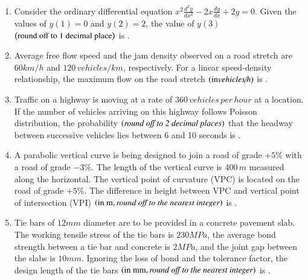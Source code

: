 \documentclass[journal,12pt,onecolumn]{IEEEtran}
\theoremstyle{remark}
\begin{document}
\begin{enumerate}
\item Consider the ordinary differential equation $x^2 \frac{d^2 y}{dx^2} - 2x \frac{dy}{dx} + 2y = 0$. Given the values of $y(1) = 0$ and $y(2) = 2$, the value of $y(3)$ $\left(\text{round off to 1 decimal place}\right)$ is \underline{\hspace{2cm}}.

\hfill{}

\item Average free flow speed and the jam density observed on a road stretch are $60 km/h$ and $120 \, vehicles/km$, respectively. For a linear speed-density relationship, the maximum flow on the road stretch $\left(\text{in} \textit{vehicles/h}\right)$ is \underline{\hspace{2cm}}.

\hfill{}

\item Traffic on a highway is moving at a rate of $360 \, vehicles \, per \, hour$ at a location. If the number of vehicles arriving on this highway follows Poisson distribution, the probability $\left(\textit{round off to 2 decimal places}\right)$ that the headway between successive vehicles lies between 6 and 10 seconds is \underline{\hspace{2cm}}.

\hfill{}

\item A parabolic vertical curve is being designed to join a road of grade $+5\%$ with a road of grade $-3\%$. The length of the vertical curve is $400 \, m$ measured along the horizontal. The vertical point of curvature (VPC) is located on the road of grade $+5\%$. The difference in height between VPC and vertical point of intersection (VPI) $\left(\text{in m}, \textit{round off to the nearest integer}\right)$ is \underline{\hspace{2cm}}.

\hfill{}

\item Tie bars of $12 mm$ diameter are to be provided in a concrete pavement slab. The working tensile stress of the tie bars is $230 MPa$, the average bond strength between a tie bar and concrete is $2 MPa$, and the joint gap between the slabs is $10 mm$. Ignoring the loss of bond and the tolerance factor, the design length of the tie bars $\left(\text{in mm}, \textit{round off to the nearest integer}\right)$ is \underline{\hspace{2cm}}.


\end{enumerate}
\end{document}
